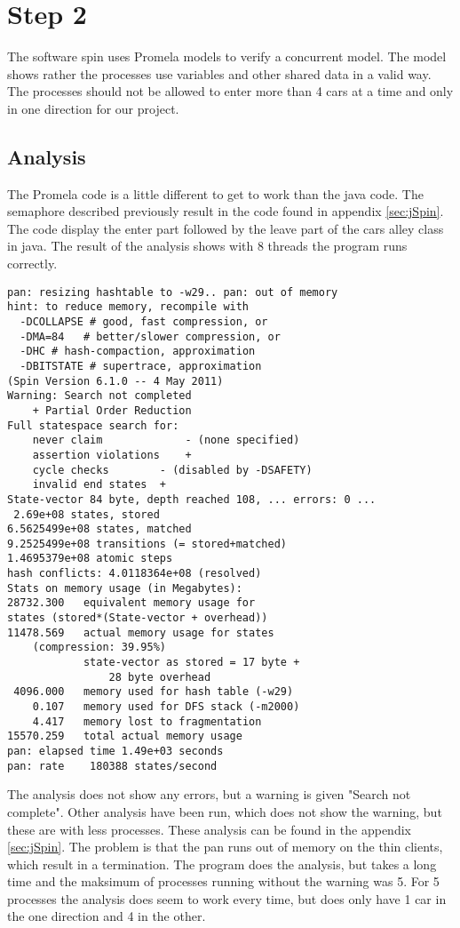 \section{Step 2}
The software spin uses Promela models to verify a concurrent model. The model shows rather the processes use variables and other shared data in a valid way. The processes should not be allowed to enter more than 4 cars at a time and only in one direction for our project.
\\

\subsection{Analysis}
The Promela code is a little different to get to work than the java code. The semaphore described previously result in the code found in appendix \ref{sec:jSpin}. The code display the enter part followed by the leave part of the cars alley class in java. The result of the analysis shows with 8 threads the program runs correctly. 

\begin{lstlisting}
pan: resizing hashtable to -w29.. pan: out of memory
hint: to reduce memory, recompile with
  -DCOLLAPSE # good, fast compression, or
  -DMA=84   # better/slower compression, or
  -DHC # hash-compaction, approximation
  -DBITSTATE # supertrace, approximation
(Spin Version 6.1.0 -- 4 May 2011)
Warning: Search not completed
	+ Partial Order Reduction
Full statespace search for:
	never claim         	- (none specified)
	assertion violations	+
	cycle checks       	- (disabled by -DSAFETY)
	invalid end states	+
State-vector 84 byte, depth reached 108, ... errors: 0 ...
 2.69e+08 states, stored
6.5625499e+08 states, matched
9.2525499e+08 transitions (= stored+matched)
1.4695379e+08 atomic steps
hash conflicts: 4.0118364e+08 (resolved)
Stats on memory usage (in Megabytes):
28732.300	equivalent memory usage for 
states (stored*(State-vector + overhead))
11478.569	actual memory usage for states 
    (compression: 39.95%)
         	state-vector as stored = 17 byte + 
         	    28 byte overhead
 4096.000	memory used for hash table (-w29)
    0.107	memory used for DFS stack (-m2000)
    4.417	memory lost to fragmentation
15570.259	total actual memory usage
pan: elapsed time 1.49e+03 seconds
pan: rate    180388 states/second
\end{lstlisting}

The analysis does not show any errors, but a warning is given "Search not complete". Other analysis have been run, which does not show the warning, but these are with less processes. These analysis can be found in the appendix \ref{sec:jSpin}. The problem is that the pan runs out of memory on the thin clients, which result in a termination. The program does the analysis, but takes a long time and the maksimum of processes running without the warning was 5. For 5 processes the analysis does seem to work every time, but does only have 1 car in the one direction and 4 in the other.

